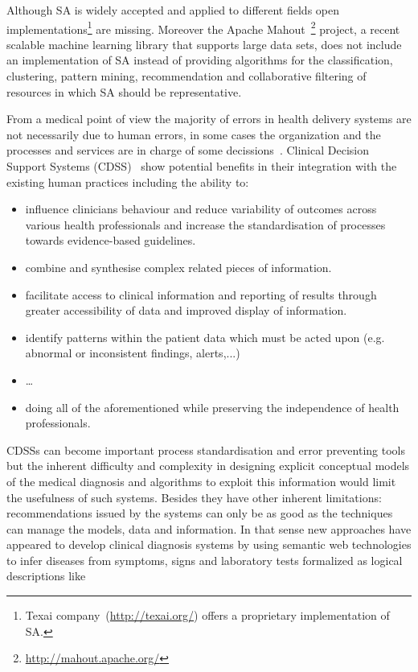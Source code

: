 Although SA is widely accepted and applied to different fields open implementations\footnote{ 
Texai company~(\url{http://texai.org/}) offers a proprietary implementation of SA.} are missing. Moreover 
the Apache Mahout~\footnote{\url{http://mahout.apache.org/}} project, a recent scalable machine learning library 
that supports large data sets, does not include an implementation of SA instead of 
providing algorithms for the classification, clustering, pattern mining, 
recommendation and collaborative filtering of resources in which SA should be representative. 
 
From a medical point of view the majority of errors in health delivery
systems are not necessarily due to human errors, in some cases
the organization and the processes and services are in charge of
some decissions~\cite{Bouamrane:2010:EUO:1940334.1940339,Kreuzthaler:jucs_17_7:a_comparison_of_different}. 
Clinical Decision Support Systems (CDSS)~\cite{citeulike:6634523,citeulike:7653300}
show potential benefits in their integration with the existing human
practices including the ability to:
\begin{itemize}
 \item influence clinicians behaviour and reduce variability of outcomes across
various health professionals and increase the standardisation of processes towards
evidence-based guidelines.
\item combine and synthesise complex related pieces of information.
\item facilitate access to clinical information and reporting of results through
greater accessibility of data and improved display of information.
\item identify patterns within the patient data which must be acted upon (e.g. abnormal or inconsistent findings, alerts,...)
\item \ldots
\item doing all of the aforementioned while preserving the independence of health professionals.
\end{itemize}

CDSSs can become important process standardisation and error preventing tools but
the inherent difficulty and complexity in designing explicit conceptual models of
the medical diagnosis and algorithms to exploit this information would limit the usefulness 
of such systems. Besides they have other inherent limitations: recommendations issued by the systems 
can only be as good as the techniques can manage the models, data and information. 
In that sense new approaches have appeared to develop clinical diagnosis systems 
by using semantic web technologies to infer diseases from symptoms, signs and laboratory tests 
formalized as logical descriptions like~\cite{DBLP:journals/eswa/Garcia-CrespoGMBP10,DBLP:conf/cbms/GonzalezGAGP09,DBLP:conf/etelemed/RodriguezMAPGA09}


